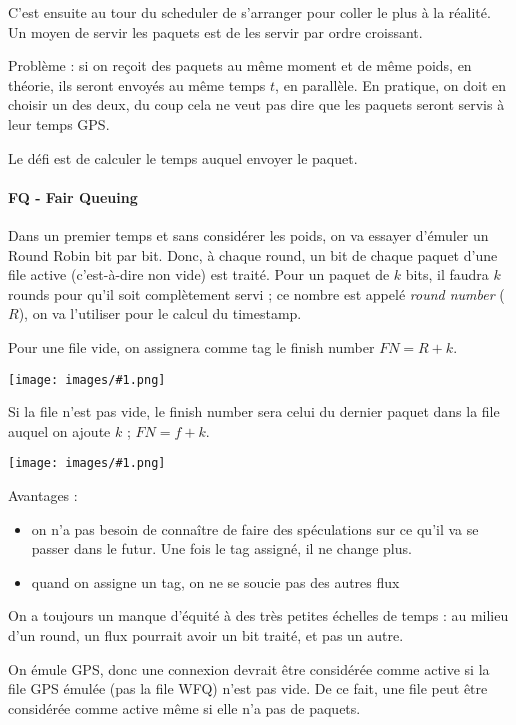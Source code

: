 \documentclass[10pt,a4paper]{report}
\newcommand{\dessin}[1]{\begin{center}\texttt{[image: images/\#1.png]}\end{center}}
\begin{document}
			C'est ensuite au tour du scheduler de s'arranger pour coller le plus à la réalité. Un moyen de servir les paquets est de les servir par ordre croissant.

			
			Problème : si on reçoit des paquets au même moment et de même poids, en théorie, ils seront envoyés au même temps $t$, en parallèle. En pratique, on doit en choisir un des deux, du coup cela ne veut pas dire que les paquets seront servis à leur temps GPS.
			
			Le défi est de calculer le temps auquel envoyer le paquet.
			
			
			\paragraph{FQ - Fair Queuing}
			Dans un premier temps et sans considérer les poids, on va essayer d'émuler un Round Robin bit par bit. Donc, à chaque round, un bit de chaque paquet d'une file active (c'est-à-dire non vide) est traité. Pour un paquet de $k$ bits, il faudra $k$ rounds pour qu'il soit complètement servi ; ce nombre est appelé \textit{round number} ($R$), on va l'utiliser pour le calcul du timestamp.
			
			Pour une file vide, on assignera comme tag le finish number $FN = R + k$.
			
			\dessin{96}
			
			Si la file n'est pas vide, le finish number sera celui du dernier paquet dans la file auquel on ajoute $k$ ; $FN = f + k$.
			
			\dessin{97}
			
			Avantages : 
			
			\begin{itemize}
				\item on n'a pas besoin de connaître de faire des spéculations sur ce qu'il va se passer dans le futur. Une fois le tag assigné, il ne change plus.
				\item quand on assigne un tag, on ne se soucie pas des autres flux
			\end{itemize}
			
			On a toujours un manque d'équité à des très petites échelles de temps : au milieu d'un round, un flux pourrait avoir un bit traité, et pas un autre.
			
			On émule GPS, donc une connexion devrait être considérée comme active si la file GPS émulée (pas la file WFQ) n'est pas vide. De ce fait, une file peut être considérée comme active même si elle n'a pas de paquets.
			
\end{document}
